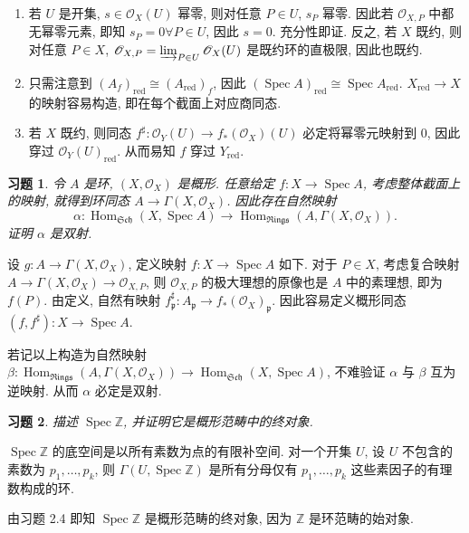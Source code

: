 \documentclass{article}
\theoremstyle{exercise}
\newtheorem{exercise}{习题}[section]
\newenvironment{proofc}{\proof}{\endproof}
\def\gp{\mathfrak{p}}
\def\Z{\mathbb{Z}}
\def\sO{\mathscr{O}}
\def\Sch{\mathfrak{Sch}}
\def\Rings{\mathfrak{Rings}}
\def\red{\mathrm{red}}
\def\Hom{\operatorname{Hom}}
\def\Spec{\operatorname{Spec}}
\begin{document}
\begin{proofc}
  \begin{enumerate}[label={(\alph*)}]
    \item 若 $U$ 是开集, $s \in \sO_X(U)$ 幂零, 则对任意 $P \in U$, $s_P$ 幂零.
          因此若 $\sO_{X, P}$ 中都无幂零元素, 即知 $s_P = 0 \forall P \in U$, 因此 $s = 0$.
          充分性即证.
          反之, 若 $X$ 既约, 则对任意 $P \in X$,
          $\sO_{X, P} = \varinjlim_{P \in U} \sO_X(U)$ 是既约环的直极限, 因此也既约.

    \item 只需注意到 $(A_f)_{\red} \cong (A_{\red})_f$,
          因此 $(\Spec A)_{\red} \cong \Spec A_{\red}$.
          $X_{\red} \to X$ 的映射容易构造, 即在每个截面上对应商同态.

    \item 若 $X$ 既约, 则同态 $f^\sharp \colon \sO_Y(U) \to f_*(\sO_X)(U)$
          必定将幂零元映射到 $0$, 因此穿过 $\sO_Y(U)_{\red}$.
          从而易知 $f$ 穿过 $Y_{\red}$.
          \qedhere
  \end{enumerate}
\end{proofc}

\begin{exercise}
  令 $A$ 是环, $(X, \sO_X)$ 是概形. 任意给定 $f \colon X \to \Spec A$,
  考虑整体截面上的映射, 就得到环同态 $A \to \Gamma(X, \sO_X)$.
  因此存在自然映射
  \[
    \alpha \colon \Hom_{\Sch}(X, \Spec A) \to \Hom_{\Rings}(A, \Gamma(X, \sO_X)).
  \]
  证明 $\alpha$ 是双射.
\end{exercise}

\begin{proofc}
  设 $g \colon A \to \Gamma(X, \sO_X)$, 定义映射 $f \colon X \to \Spec A$ 如下.
  对于 $P \in X$, 考虑复合映射 $A \to \Gamma(X, \sO_X) \to \sO_{X, P}$,
  则 $\sO_{X, P}$ 的极大理想的原像也是 $A$ 中的素理想, 即为 $f(P)$.
  由定义, 自然有映射 $f^\sharp_{\gp} \colon A_{\gp} \to f_*(\sO_X)_{\gp}$.
  因此容易定义概形同态 $(f, f^\sharp) \colon X \to \Spec A$.

  若记以上构造为自然映射
  $\beta \colon \Hom_{\Rings}(A, \Gamma(X, \sO_X)) \to \Hom_{\Sch}(X, \Spec A)$,
  不难验证 $\alpha$ 与 $\beta$ 互为逆映射. 从而 $\alpha$ 必定是双射.
\end{proofc}

\begin{exercise}
  描述 $\Spec \Z$, 并证明它是概形范畴中的终对象.
\end{exercise}

\begin{proofc}
  $\Spec \Z$ 的底空间是以所有素数为点的有限补空间.
  对一个开集 $U$, 设 $U$ 不包含的素数为 $p_1, \dots, p_k$,
  则 $\Gamma(U, \Spec \Z)$ 是所有分母仅有 $p_1, \dots, p_k$ 这些素因子的有理数构成的环.

  由习题 2.4 即知 $\Spec \Z$ 是概形范畴的终对象,
  因为 $\Z$ 是环范畴的始对象.
\end{proofc}
\end{document}
